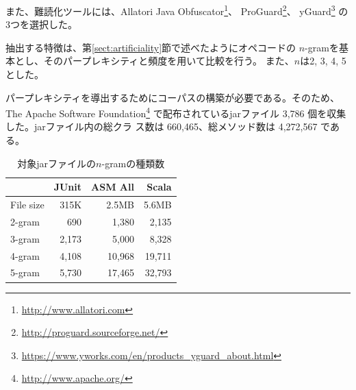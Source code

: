 \documentclass[12pt,twoside]{jreport}
\begin{document}
また、難読化ツールには、Allatori Java
Obfuscator\footnote{\url{http://www.allatori.com}}、
ProGuard\footnote{\url{http://proguard.sourceforge.net/}}、
yGuard\footnote{\url{https://www.yworks.com/en/products_yguard_about.html}}
の3つを選択した。

抽出する特徴は、第\ref{sect:artificiality}節で述べたようにオペコードの
$n$-gramを基本とし、そのパープレキシティと頻度を用いて比較を行う。
また、$n$は2, 3, 4, 5とした。

パープレキシティを導出するためにコーパスの構築が必要である。そのため、
The Apache Software Foundation\footnote{\url{http://www.apache.org/}}
で配布されているjarファイル 3,786 個を収集した。jarファイル内の総クラ
ス数は 660,465、総メソッド数は 4,272,567 である。

\begin{table}[t]
  \centering
  \caption{対象jarファイルの$n$-gramの種類数}\label{table:original}
  {\footnotesize
  \begin{tabular}{l|rrr}
    & JUnit & ASM All & Scala \\ \hline
File size & 315K & 2.5MB & 5.6MB\\ \hline
2-gram &   690 &  1,380 &  2,135 \\ 
3-gram & 2,173 &  5,000 &  8,328 \\
4-gram & 4,108 & 10,968 & 19,711 \\
5-gram & 5,730 & 17,465 & 32,793 
  \end{tabular}}
\end{table}
\end{document}
